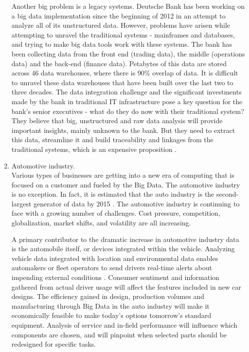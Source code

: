 \documentclass[runningheads]{llncs}
\begin{document}
\begin{enumerate}
Another big problem is a legacy systems. Deutsche Bank has been working on a big data implementation since the beginning of 2012 in an attempt to analyze all of its unstructured data. However, problems have arisen while attempting to unravel the traditional systems - mainframes and databases, and trying to make big data tools work with these systems. The bank has been collecting data from the front end (trading data), the middle (operations data) and the back-end (finance data). Petabytes of this data are stored across 46 data warehouses, where there is 90\% overlap of data. It is difficult to unravel these data warehouses that have been built over the last two to three decades. The data integration challenge and the significant investments made by the bank in traditional IT infrastructure pose a key question for the bank's senior executives - what do they do now with their traditional system? They believe that big, unstructured and raw data analysis will provide important insights, mainly unknown to the bank. But they need to extract this data, streamline it and build traceability and linkages from the traditional systems, which is an expensive proposition \cite{PREEZ}.\\

\item Automotive industry.\\

Various types of businesses are getting into a new era of computing that is focused on a customer and fueled by the Big Data. The automotive industry is no exception. In fact, it is estimated that the auto industry is the second-largest generator of data by 2015 \cite{MCKINSEY}. The automotive industry is continuing to face with a growing number of challenges. Cost pressure, competition, globalization, market shifts, and volatility are all increasing.

A primary contributor to the dramatic increase in automotive industry data is the automobile itself, or devices integrated within the vehicle. Analyzing vehicle data integrated with location and environmental data enables automakers or fleet operators to send drivers real-time alerts about impending external conditions \cite{IBMAUTOMOTIVE}. Consumer sentiment and information gathered from actual driver usage will affect the features included in new car designs. The efficiency gained in design, production volumes and manufacturing through Big Data in the auto industry will make it economically feasible to make today's options tomorrow's standard equipment. Analysis of service and in-field performance will influence which components are chosen, and will pinpoint when selected parts should be redesigned for specific tasks.

\end{enumerate}
\end{document}

